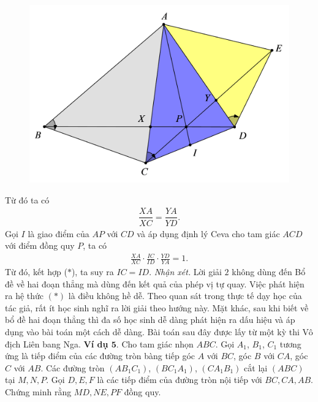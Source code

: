 \begin{multicols}{2}
	\begin{figure}[H]
		\vspace*{-5pt}
		\centering
		\captionsetup{labelformat= empty, justification=centering}
		\includegraphics[width= 1\linewidth]{10}
		\vspace*{-15pt}
	\end{figure}
	Từ đó ta có
	\begin{align*}
		\dfrac{XA}{XC} = \dfrac{YA}{YD}. \tag{$*$}
	\end{align*}
	Gọi $I$ là giao điểm của $AP$ với $CD$ và áp dụng định lý Ceva cho tam giác $ACD$ với điểm đồng quy $P$, ta có
	\begin{align*}
		\frac{XA}{XC}\cdot \frac{IC}{ID}\cdot\frac{YD}{YA} = 1.
	\end{align*}
	Từ đó, kết hợp ($*$), ta suy ra $IC=ID$.
	\vskip 0.1cm
	\textit{Nhận xét.}  Lời giải $2$ không dùng đến Bổ đề về hai đoạn thẳng mà dùng đến kết quả của phép vị tự quay. Việc phát hiện ra hệ thức $(*)$ là điều không hề dễ. Theo quan sát trong thực tế dạy học của tác giả, rất ít học sinh nghĩ ra  lời giải theo hướng này. Mặt khác, sau khi biết về bổ đề hai đoạn thẳng thì đa số học sinh dễ dàng phát hiện ra dấu hiệu và áp dụng vào bài toán một cách dễ dàng.
	\vskip 0.1cm
	Bài toán sau đây được lấy từ một kỳ thi Vô địch Liên bang Nga.
	\vskip 0.1cm
	\textbf{\color{hoccungpi}Ví dụ $\pmb{5.}$} Cho tam giác nhọn $ABC$. Gọi $A_1$, $B_1$, $C_1$ tương ứng là tiếp điểm của các đường tròn bàng tiếp góc $A$ với $BC$, góc $B$ với $CA$, góc $C$ với $AB$. Các đường tròn $(AB_1C_1)$, $(BC_1A_1)$, $(CA_1B_1)$ cắt lại $(ABC)$ tại $M,N,P$. Gọi $D,E,F$ là các tiếp điểm của đường tròn nội tiếp với $BC,CA,AB$. Chứng minh rằng $MD,NE,PF$ đồng quy.
	\begin{figure}[H]

\end{figure}
\end{multicols}

